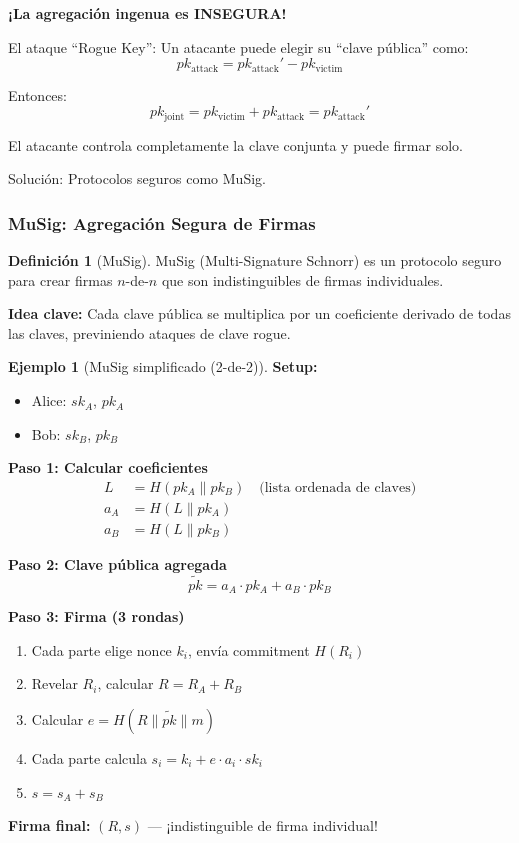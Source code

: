\documentclass[11pt,a4paper,twoside,openright]{book}
\theoremstyle{definition}
\newtheorem{definition}{Definición}[chapter]
\newtheorem{example}{Ejemplo}[chapter]
\theoremstyle{plain}
\theoremstyle{remark}
\begin{document}
\begin{advertencia}
\textbf{¡La agregación ingenua es INSEGURA!}

El ataque ``Rogue Key'': Un atacante puede elegir su ``clave pública'' como:
\[ pk_{\text{attack}} = pk_{\text{attack}}' - pk_{\text{victim}} \]

Entonces:
\[ pk_{\text{joint}} = pk_{\text{victim}} + pk_{\text{attack}} = pk_{\text{attack}}' \]

El atacante controla completamente la clave conjunta y puede firmar solo.

Solución: Protocolos seguros como MuSig.
\end{advertencia}

\subsubsection{MuSig: Agregación Segura de Firmas}

\begin{definition}[MuSig]
MuSig (Multi-Signature Schnorr) es un protocolo seguro para crear firmas $n$-de-$n$ que son indistinguibles de firmas individuales.

\textbf{Idea clave:} Cada clave pública se multiplica por un coeficiente derivado de todas las claves, previniendo ataques de clave rogue.
\end{definition}

\begin{example}[MuSig simplificado (2-de-2)]
\textbf{Setup:}
\begin{itemize}
    \item Alice: $sk_A$, $pk_A$
    \item Bob: $sk_B$, $pk_B$
\end{itemize}

\textbf{Paso 1: Calcular coeficientes}
\begin{align}
L &= H(pk_A \| pk_B) \quad \text{(lista ordenada de claves)} \\
a_A &= H(L \| pk_A) \\
a_B &= H(L \| pk_B)
\end{align}

\textbf{Paso 2: Clave pública agregada}
\[ \tilde{pk} = a_A \cdot pk_A + a_B \cdot pk_B \]

\textbf{Paso 3: Firma (3 rondas)}
\begin{enumerate}
    \item Cada parte elige nonce $k_i$, envía commitment $H(R_i)$
    \item Revelar $R_i$, calcular $R = R_A + R_B$
    \item Calcular $e = H(R \| \tilde{pk} \| m)$
    \item Cada parte calcula $s_i = k_i + e \cdot a_i \cdot sk_i$
    \item $s = s_A + s_B$
\end{enumerate}

\textbf{Firma final:} $(R, s)$ — ¡indistinguible de firma individual!
\end{example}
\end{document}
